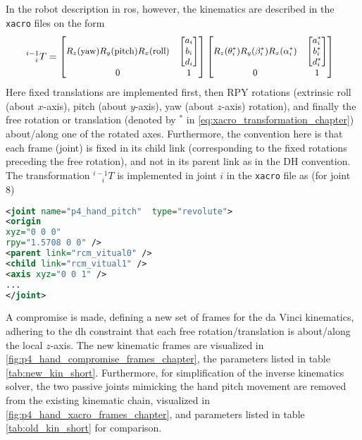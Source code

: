 In the robot description in \gls{ros}, however, the kinematics are described in the \texttt{xacro} files on the form
\begin{equation}
\hspace*{-2mm}
\small
^{i-1}_{\phantom{-1}i}T =
\begin{bmatrix}
R_z(\text{yaw})R_y(\text{pitch})R_x(\text{roll}) & \begin{bmatrix}a_i\\ b_i\\ d_i\end{bmatrix}\\
0 & 1
\end{bmatrix}
\begin{bmatrix}
R_z(\theta_i^*)R_y(\beta_i^*)R_x(\alpha_i^*) & \begin{bmatrix}a_i^*\\ b_i^*\\ d_i^* \end{bmatrix}\\
0 & 1
\end{bmatrix}
\label{eq:xacro_transformation_chapter}
\end{equation}
Here fixed translations are implemented first, then RPY rotations (extrinsic roll (about $x$-axis), pitch (about $y$-axis), yaw (about $z$-axis) rotation), and finally the free rotation or translation (denoted by $^*$ in \autoref{eq:xacro_transformation_chapter}) about/along one of the rotated axes. Furthermore, the convention here is that each frame (joint) is fixed in its child link (corresponding to the fixed rotations preceding the free rotation), and not in its parent link as in the DH convention. The transformation  $^{i-1}_{\phantom{-1}i} T$ is implemented in joint $i$ in the \texttt{xacro} file  as (for joint 8)
\begin{lstlisting}[language=xml]
<joint name="p4_hand_pitch"  type="revolute">
<origin
xyz="0 0 0"
rpy="1.5708 0 0" />
<parent link="rcm_vitual0" />
<child link="rcm_vitual1" />
<axis xyz="0 0 1" />
...
</joint>
\end{lstlisting}

A compromise is made, defining a new set of frames for the da Vinci kinematics, adhering to the \gls{dh} constraint that each free rotation/translation is about/along the local $z$-axis. The new kinematic frames are visualized in \autoref{fig:p4_hand_compromise_frames_chapter}, the parameters listed in table \ref{tab:new_kin_short}. Furthermore, for simplification of the inverse kinematics solver, the two passive joints mimicking the hand pitch movement are removed from the existing kinematic chain, visualized in \autoref{fig:p4_hand_xacro_frames_chapter}, and parameters listed in table \ref{tab:old_kin_short} for comparison.  



